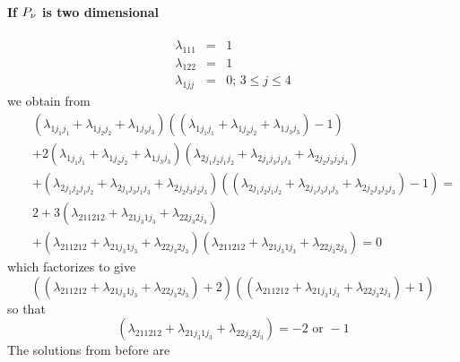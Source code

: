 \documentclass[12pt]{article}
\begin{document}
\paragraph{If $P_{\mathcal{\protect\nu }}$ is two dimensional}

\begin{eqnarray*}
\lambda _{111} &=&1 \\
\lambda _{122} &=&1 \\
\lambda _{1jj} &=&0;\,3\leq j\leq 4
\end{eqnarray*}%
we obtain from 
\begin{eqnarray*}
&&\left( \lambda _{1j_{1}j_{1}}+\lambda _{1j_{2}j_{2}}+\lambda
_{1}{}_{j_{3}j_{3}}\right) \left( \left( \lambda _{1j_{1}j_{1}}+\lambda
_{1j_{2}j_{2}}+\lambda _{1}{}_{j_{3}j_{3}}\right) -1\right) \\
&&+2\left( \lambda _{1j_{1}j_{1}}+\lambda _{1j_{2}j_{2}}+\lambda
_{1}{}_{j_{3}j_{3}}\right) \left( \lambda _{2j_{1}j_{2}j_{1}j_{2}}+\lambda
_{2j_{1}j_{3}j_{1}j_{3}}+\lambda _{2j_{2}j_{3}j_{2}j_{3}}\right) \\
&&+\left( \lambda _{2j_{1}j_{2}j_{1}j_{2}}+\lambda
_{2j_{1}j_{3}j_{1}j_{3}}+\lambda _{2j_{2}j_{3}j_{2}j_{3}}\right) \left(
\left( \lambda _{2j_{1}j_{2}j_{1}j_{2}}+\lambda
_{2j_{1}j_{3}j_{1}j_{3}}+\lambda _{2j_{2}j_{3}j_{2}j_{3}}\right) -1\right) =
\\
&&2+3\left( \lambda _{211212}+\lambda _{21j_{3}1j_{3}}+\lambda
_{22j_{3}2j_{3}}\right) \\
&&\left. +\right. \left( \lambda _{211212}+\lambda _{21j_{3}1j_{3}}+\lambda
_{22j_{3}2j_{3}}\right) \left( \lambda _{211212}+\lambda
_{21j_{3}1j_{3}}+\lambda _{22j_{3}2j_{3}}\right) =0
\end{eqnarray*}%
which factorizes to give 
\begin{equation*}
\left( \left( \lambda _{211212}+\lambda _{21j_{3}1j_{3}}+\lambda
_{22j_{3}2j_{3}}\right) +2\right) \left( \left( \lambda _{211212}+\lambda
_{21j_{3}1j_{3}}+\lambda _{22j_{3}2j_{3}}\right) +1\right)
\end{equation*}%
so that 
\begin{equation*}
\left( \lambda _{211212}+\lambda _{21j_{3}1j_{3}}+\lambda
_{22j_{3}2j_{3}}\right) =-2\text{ or }-1
\end{equation*}
The solutions from before are 
\end{document}
